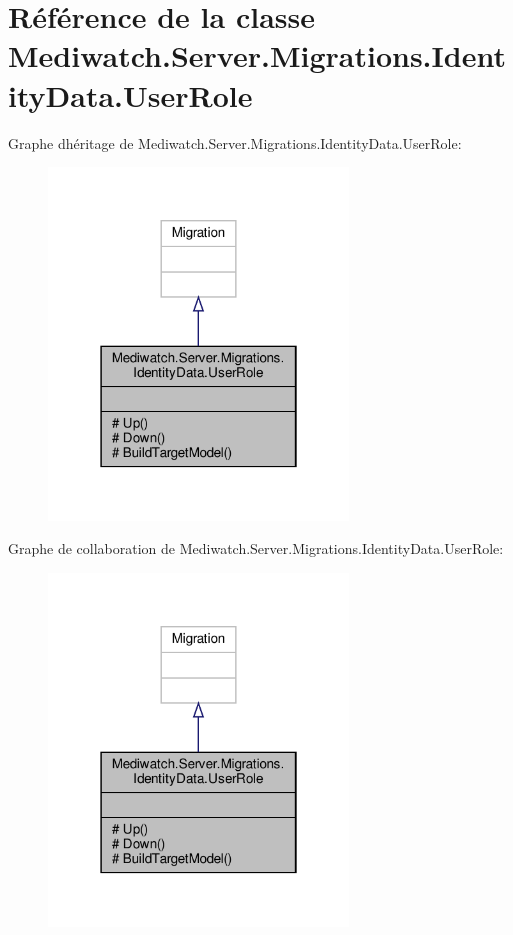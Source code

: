 \hypertarget{class_mediwatch_1_1_server_1_1_migrations_1_1_identity_data_1_1_user_role}{}\section{Référence de la classe Mediwatch.\+Server.\+Migrations.\+Identity\+Data.\+User\+Role}
\label{class_mediwatch_1_1_server_1_1_migrations_1_1_identity_data_1_1_user_role}


Graphe d\textquotesingle{}héritage de Mediwatch.\+Server.\+Migrations.\+Identity\+Data.\+User\+Role\+:\nopagebreak
\begin{figure}[H]
\begin{center}
\leavevmode
\includegraphics[width=226pt]{class_mediwatch_1_1_server_1_1_migrations_1_1_identity_data_1_1_user_role__inherit__graph}
\end{center}
\end{figure}


Graphe de collaboration de Mediwatch.\+Server.\+Migrations.\+Identity\+Data.\+User\+Role\+:\nopagebreak
\begin{figure}[H]
\begin{center}
\leavevmode
\includegraphics[width=226pt]{class_mediwatch_1_1_server_1_1_migrations_1_1_identity_data_1_1_user_role__coll__graph}
\end{center}
\end{figure}

